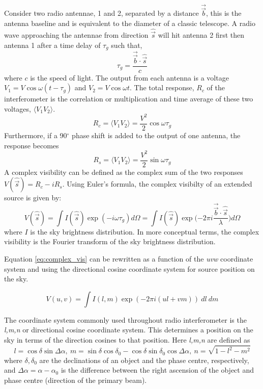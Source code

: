 Consider two radio antennae, 1 and 2, separated by a distance $\overrightarrow{\Vec{b}}$, this is the antenna baseline and is equivalent to the diameter of a classic telescope. A radio wave approaching the antennae from direction $\hat{\Vec{s}}$  will hit antenna 2 first then antenna 1 after a time delay of $\tau_g$ such that,
$$\tau_g = \frac{\overrightarrow{\Vec{b}} \cdot \hat{\Vec{s}}}{c} $$
where $c$ is the speed of light. The output from each antenna is a voltage $V_1 = V \cos{\omega(t - \tau_g)}$ and $V_2 = V\cos{\omega t}$. The total response, $R_c$ of the interferometer is the correlation or multiplication and time average of these two voltages, $\langle V_1 V_2 \rangle$. 
$$
R_c = \langle V_1 V_2 \rangle = \frac{V^2}{2} \cos{\omega \tau_g}
$$
Furthermore, if a 90$^\circ$ phase shift is added to the output of one antenna, the response becomes
$$
R_s = \langle V_1 V_2 \rangle = \frac{V^2}{2} \sin{\omega \tau_g}
$$
A complex visibility can be defined as the complex sum of the two responses $V(\hat{\Vec{s}}) = R_c - iR_s$. Using Euler's formula, the complex visibilty of an extended source is given by:
\begin{equation}
\label{eq:complex_vis}
V(\hat{\Vec{s}}) = \int I(\hat{\Vec{s}}) \exp{(-i \omega \tau_g)} d\Omega = \int I(\hat{\Vec{s}}) \exp{(-2 \pi i \frac{\overrightarrow{\Vec{b}} \cdot \hat{\Vec{s}}}{\lambda}}) d\Omega
\end{equation}
where $I$ is the sky brightness distribution. In more conceptual terms, the complex visibility is the Fourier transform of the sky brightness distribution.

Equation \ref{eq:complex_vis} can be rewritten as a function of the \textit{uvw} coordinate system and using the directional cosine coordinate system for source position on the sky.

\begin{equation}
\label{eq:complex_vis_uvw}
V(u,v) = \int I(l,m) \exp{(-2 \pi i (ul + vm))}\ dl\ dm
\end{equation}

The coordinate system commonly used throughout radio interferometer is the \textit{l,m,n} or directional cosine coordinate system. This determines a position on the sky in terms of the direction cosines to that position. Here \textit{l,m,n} are defined as
$$ l =  \cos \delta  \sin \Delta \alpha, \ 
 m = \sin \delta \cos \delta_0 - \cos \delta \sin \delta_0 \cos\Delta \alpha, \ 
 n = \sqrt{1-l^2-m^2}$$
where $\delta, \delta_0$ are the declinations of an object and the phase centre, respectively, and $\Delta \alpha = \alpha -\alpha_0$ is the difference between the right ascension of the object and phase centre (direction of the primary beam).

